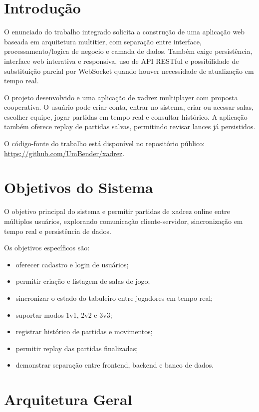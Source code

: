 \documentclass[12pt]{article}
\begin{document}
\section{Introdução}

O enunciado do trabalho integrado solicita a construção de uma aplicação web baseada em arquitetura multitier, com separação entre interface, processamento/logica de negocio e camada de dados. Também exige persistência, interface web interativa e responsiva, uso de API RESTful e possibilidade de substituição parcial por WebSocket quando houver necessidade de atualização em tempo real.

O projeto desenvolvido e uma aplicação de xadrez multiplayer com proposta cooperativa. O usuário pode criar conta, entrar no sistema, criar ou acessar salas, escolher equipe, jogar partidas em tempo real e consultar histórico. A aplicação também oferece replay de partidas salvas, permitindo revisar lances já persistidos.

O código-fonte do trabalho está disponível no repositório público: \url{https://github.com/UmBender/xadrez}.

\section{Objetivos do Sistema}

O objetivo principal do sistema e permitir partidas de xadrez online entre múltiplos usuários, explorando comunicação cliente-servidor, sincronização em tempo real e persistência de dados.

Os objetivos específicos são:

\begin{itemize}
    \item oferecer cadastro e login de usuários;
    \item permitir criação e listagem de salas de jogo;
    \item sincronizar o estado do tabuleiro entre jogadores em tempo real;
    \item suportar modos 1v1, 2v2 e 3v3;
    \item registrar histórico de partidas e movimentos;
    \item permitir replay das partidas finalizadas;
    \item demonstrar separação entre frontend, backend e banco de dados.
\end{itemize}

\section{Arquitetura Geral}
\end{document}

